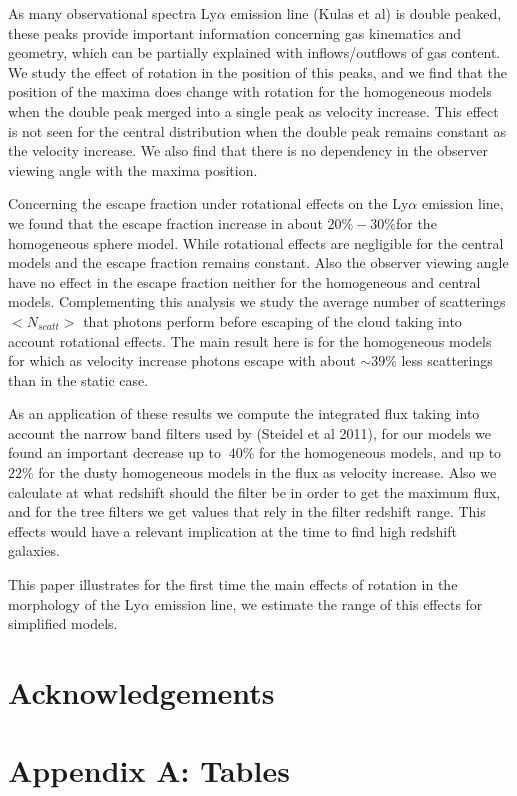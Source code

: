 \documentclass[usenatbib]{mn2e}
\begin{document}
As many observational spectra Ly$\alpha$ emission line (Kulas et al)
is double  peaked, these peaks provide important information
concerning gas kinematics and geometry,  which can be partially
explained with inflows/outflows of gas content.  We study the effect
of rotation in the position of this peaks, and we find  that the
position of the maxima does change with rotation for the homogeneous
models when the double peak merged into a single peak as velocity
increase. This effect is not seen for the central distribution when
the double peak  remains constant as the velocity increase. We also
find that there is no dependency in the observer viewing angle with
the maxima position. 

Concerning the escape fraction under rotational effects on the
Ly$\alpha$ emission line, we found that the escape fraction increase
in about $20\%-30\%$for the homogeneous sphere model. While rotational
effects are negligible for the central models and the escape fraction
remains constant. Also the observer viewing angle have no effect in
the escape fraction neither for the homogeneous and central
models. Complementing this analysis we study the average number of
scatterings $<N_{scatt}>$ that photons perform before escaping of the
cloud taking into account rotational effects. The main result here is
for the homogeneous models for which as velocity increase photons
escape with about $\sim 39\%$  less scatterings than in the static
case. 

As an application of these results we compute the integrated flux
taking into account the narrow band filters used by (Steidel et al
2011), for our models we found an important decrease up to $~40\%$ for
the homogeneous models, and up to $22\%$ for the dusty homogeneous
models in the flux as velocity increase.  Also we calculate at what
redshift should the filter be in order to get the maximum  flux, and
for the tree filters we get values that rely in the filter redshift
range. This effects would have a relevant implication at the time to
find high redshift galaxies.

This paper illustrates for the first time the main effects of rotation
in the morphology of the Ly$\alpha$ emission line, we estimate the
range of this effects for simplified models.


\section*{Acknowledgements}


 

\section*{Appendix A: Tables}
\end{document}
